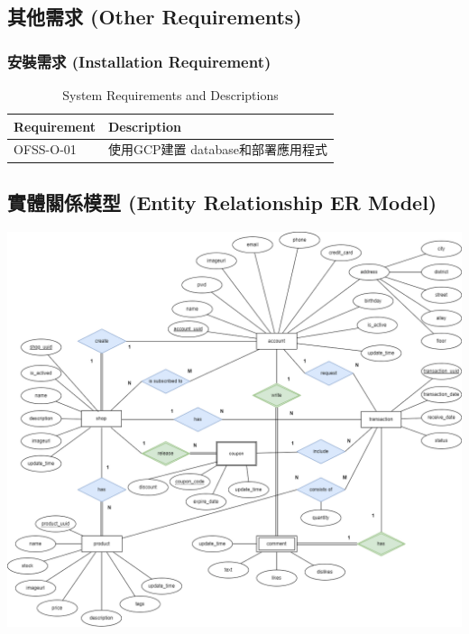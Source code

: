 \documentclass[a4paper, 12pt]{article}
\begin{document}
\subsection{其他需求 (Other Requirements)}
\subsubsection{安裝需求 (Installation Requirement)}
\begin{table}[h]
    \centering
    \renewcommand{\arraystretch}{1.35}
    \begin{tabular}{|p{3cm}|p{10cm}|}
        \hline
        \textbf{Requirement} & \textbf{Description} \\
        \hline
        OFSS-O-01 & 使用GCP建置 database和部署應用程式 \\
        \hline
    \end{tabular}
    \caption{System Requirements and Descriptions}
    \label{tab:system-requirements}
\end{table}

\newpage
\subsection{實體關係模型 (Entity Relationship ER Model)}
\includegraphics[scale=0.35]{image/nft_er_diagram.png}
\newpage
\end{document}
